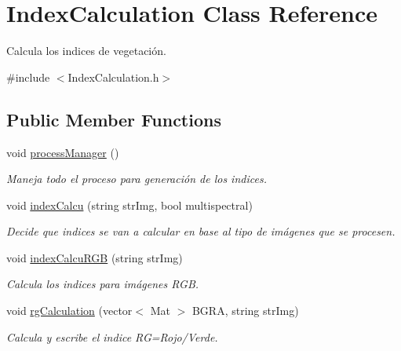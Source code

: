 \hypertarget{classIndexCalculation}{}\section{Index\+Calculation Class Reference}
\label{classIndexCalculation}


Calcula los indices de vegetación.  




{\ttfamily \#include $<$Index\+Calculation.\+h$>$}

\subsection*{Public Member Functions}
\begin{DoxyCompactItemize}
\item 
\mbox{\label{classIndexCalculation_a4890d5b4758672dfba23830b59b18892}} 
void \mbox{\hyperlink{classIndexCalculation_a4890d5b4758672dfba23830b59b18892}{process\+Manager}} ()
\begin{DoxyCompactList}\small\item\em Maneja todo el proceso para generación de los indices. \end{DoxyCompactList}\item 
void \mbox{\hyperlink{classIndexCalculation_a07039b532b218e5cfe1e603966017373}{index\+Calcu}} (string str\+Img, bool multispectral)
\begin{DoxyCompactList}\small\item\em Decide que indices se van a calcular en base al tipo de imágenes que se procesen. \end{DoxyCompactList}\item 
void \mbox{\hyperlink{classIndexCalculation_a7070ce3aebd8abd71074270eff8f88b6}{index\+Calcu\+R\+GB}} (string str\+Img)
\begin{DoxyCompactList}\small\item\em Calcula los indices para imágenes R\+GB. \end{DoxyCompactList}\item 
void \mbox{\hyperlink{classIndexCalculation_a562111a1b8920fa0136811ecd7e51e36}{rg\+Calculation}} (vector$<$ Mat $>$ B\+G\+RA, string str\+Img)
\begin{DoxyCompactList}\small\item\em Calcula y escribe el indice RG=Rojo/\+Verde. \end{DoxyCompactList}\item 

\end{DoxyCompactItemize}
